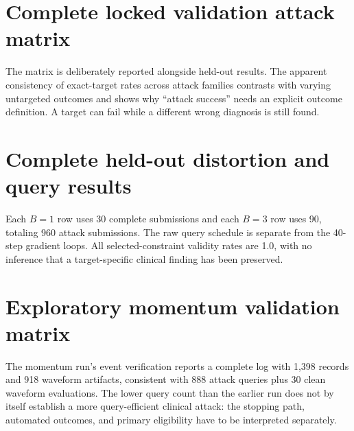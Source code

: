 \section{Complete locked validation attack matrix}
\label{app:securityvalidation}
\begin{table}[H]\centering\scriptsize
\resizebox{\linewidth}{!}{}
\caption{Locked validation E1 results for the C3 configuration. Targeted ASR intervals use the saved 10,000-resample patient bootstrap. Each row is ten patients with three seeds. These rows were available during attack selection; they are not independent held-out estimates.}
\end{table}
The matrix is deliberately reported alongside held-out results. The apparent consistency of exact-target rates across attack families contrasts with varying untargeted outcomes and shows why ``attack success'' needs an explicit outcome definition. A target can fail while a different wrong diagnosis is still found.

\section{Complete held-out distortion and query results}
\label{app:distortion}
\begin{table}[H]\centering\scriptsize
\resizebox{\linewidth}{!}{}
\caption{Mean distortion of selected valid perturbations and total complete attack queries per held-out cell. PRD and SNR are averaged per selected waveform, so they should not be recomputed from a single ratio of the table's averaged norms. The selected candidate need not be the first successful or largest-distortion query.}
\end{table}
Each $B=1$ row uses 30 complete submissions and each $B=3$ row uses 90, totaling 960 attack submissions. The raw query schedule is separate from the 40-step gradient loops. All selected-constraint validity rates are 1.0, with no inference that a target-specific clinical finding has been preserved.

\section{Exploratory momentum validation matrix}
\label{app:momentum}
\begin{table}[H]\centering\scriptsize
\resizebox{\linewidth}{!}{}
\caption{Separate momentum-decay-0.9 validation experiment. Each row has ten patients and three seeds. It is not a held-out replacement and does not share the earlier final study's historical code identity. Clinical primary evaluability remains absent.}
\end{table}
The momentum run's event verification reports a complete log with 1,398 records and 918 waveform artifacts, consistent with 888 attack queries plus 30 clean waveform evaluations. The lower query count than the earlier run does not by itself establish a more query-efficient clinical attack: the stopping path, automated outcomes, and primary eligibility have to be interpreted separately.

